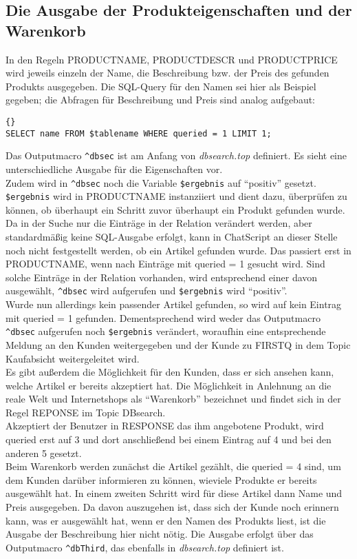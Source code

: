 \subsection{Die Ausgabe der Produkteigenschaften und der Warenkorb}
\label{sec:AusgabeWarenkorb}
In den Regeln PRODUCTNAME, PRODUCTDESCR und PRODUCTPRICE wird jeweils einzeln der Name, die Beschreibung bzw. der Preis des gefunden Produkts ausgegeben. Die SQL-Query für den Namen sei hier als Beispiel gegeben; die Abfragen für Beschreibung und Preis sind analog aufgebaut:
\begin{lstlisting}{}
SELECT name FROM $tablename WHERE queried = 1 LIMIT 1;
\end{lstlisting}
Das Outputmacro \lstinline|^dbsec| ist am Anfang von \textit{dbsearch.top} definiert. Es sieht eine unterschiedliche Ausgabe für die Eigenschaften vor.\\
Zudem wird in \lstinline|^dbsec| noch die Variable \lstinline|$ergebnis| auf "`positiv"' gesetzt. \lstinline|$ergebnis| wird in PRODUCTNAME instanziiert und dient dazu, überprüfen zu können, ob überhaupt ein Schritt zuvor überhaupt ein Produkt gefunden wurde. Da in der Suche nur die Einträge in der Relation verändert werden, aber standardmäßig keine SQL-Ausgabe erfolgt, kann in ChatScript an dieser Stelle noch nicht festgestellt werden, ob ein Artikel gefunden wurde. Das passiert erst in PRODUCTNAME, wenn nach Einträge mit queried = 1 gesucht wird. Sind solche Einträge in der Relation vorhanden, wird entsprechend einer davon ausgewählt, \lstinline|^dbsec| wird aufgerufen und \lstinline|$ergebnis| wird "`positiv"'.\\
Wurde nun allerdings kein passender Artikel gefunden, so wird auf kein Eintrag mit queried = 1 gefunden. Dementsprechend wird weder das Outputmacro \lstinline|^dbsec| aufgerufen noch \lstinline|$ergebnis| verändert, woraufhin eine entsprechende Meldung an den Kunden weitergegeben und der Kunde zu FIRSTQ in dem Topic Kaufabsicht weitergeleitet wird.\\
Es gibt außerdem die Möglichkeit für den Kunden, dass er sich ansehen kann, welche Artikel er bereits akzeptiert hat. Die Möglichkeit in Anlehnung an die reale Welt und Internetshops als "`Warenkorb"' bezeichnet und findet sich in der Regel REPONSE im Topic DBsearch.\\
Akzeptiert der Benutzer in RESPONSE das ihm angebotene Produkt, wird queried erst auf 3 und dort anschließend bei einem Eintrag auf 4 und bei den anderen 5 gesetzt.\\
Beim Warenkorb werden zunächst die Artikel gezählt, die queried = 4 sind, um dem Kunden darüber informieren zu können, wieviele Produkte er bereits ausgewählt hat. In einem zweiten Schritt wird für diese Artikel dann Name und Preis ausgegeben. Da davon auszugehen ist, dass sich der Kunde noch erinnern kann, was er ausgewählt hat, wenn er den Namen des Produkts liest, ist die Ausgabe der Beschreibung hier nicht nötig. Die Ausgabe erfolgt über das Outputmacro \lstinline|^dbThird|, das ebenfalls in \textit{dbsearch.top} definiert ist.


